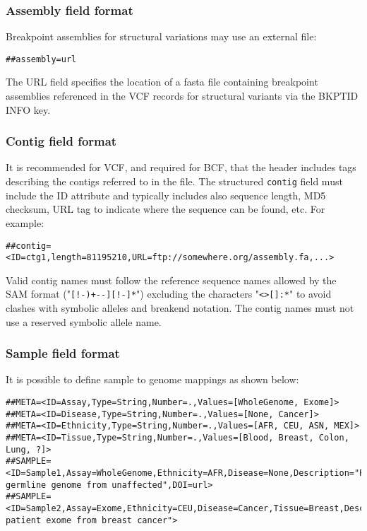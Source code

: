 \documentclass[8pt]{article}
\begin{document}
\subsubsection{Assembly field format}
Breakpoint assemblies for structural variations may use an external file:
\begin{verbatim}
##assembly=url
\end{verbatim}

The URL field specifies the location of a fasta file containing breakpoint assemblies referenced in the VCF records for structural variants via the BKPTID INFO key.

\subsubsection{Contig field format}
\label{sec-contig-field}
It is recommended for VCF, and required for BCF, that the header includes tags
describing the contigs referred to in the file. The structured \texttt{contig}
field must include the ID attribute and typically includes also
sequence length, MD5 checksum, URL tag to indicate where the sequence can be
found, etc. For example: 
\begin{verbatim}
##contig=<ID=ctg1,length=81195210,URL=ftp://somewhere.org/assembly.fa,...>
\end{verbatim}

\noindent
Valid contig names must follow the reference sequence names allowed by the SAM format
("{\tt [!-)+--][!-]*}") excluding the characters "\texttt{\textless\textgreater[]:*}" to avoid clashes with
symbolic alleles and breakend notation.  The contig names must not use a reserved symbolic allele name.


\subsubsection{Sample field format}
It is possible to define sample to genome mappings as shown below:
{\scriptsize
\begin{verbatim}
##META=<ID=Assay,Type=String,Number=.,Values=[WholeGenome, Exome]>
##META=<ID=Disease,Type=String,Number=.,Values=[None, Cancer]>
##META=<ID=Ethnicity,Type=String,Number=.,Values=[AFR, CEU, ASN, MEX]>
##META=<ID=Tissue,Type=String,Number=.,Values=[Blood, Breast, Colon, Lung, ?]>
##SAMPLE=<ID=Sample1,Assay=WholeGenome,Ethnicity=AFR,Disease=None,Description="Patient germline genome from unaffected",DOI=url>
##SAMPLE=<ID=Sample2,Assay=Exome,Ethnicity=CEU,Disease=Cancer,Tissue=Breast,Description="European patient exome from breast cancer">
\end{verbatim}}
\end{document}
